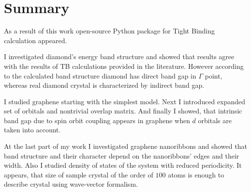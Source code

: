 \chapter{Summary}

As a result of this work open-source Python package for Tight Binding calculation appeared. 

I investigated diamond's energy band structure and showed that results agree with the results of TB calculations provided in the literature. However according to the calculated band structure diamond has direct band gap in $\Gamma$ point, whereas real diamond crystal is characterized by indirect band gap.

I studied graphene starting with the simplest model. Next I introduced expanded set of orbitals and nontrivial overlap matrix. And finally I showed, that intrinsic band gap due to spin orbit coupling appears in graphene when $d$ orbitals are taken into account.

At the last part of my work I investigated graphene nanoribbons and showed that band structure and their character depend on the nanoribbons' edges and their width. Also I studied density of states of the system with reduced periodicity. It appears, that size of sample crystal of the order of $100$ atoms is enough to describe crystal using wave-vector formalism.